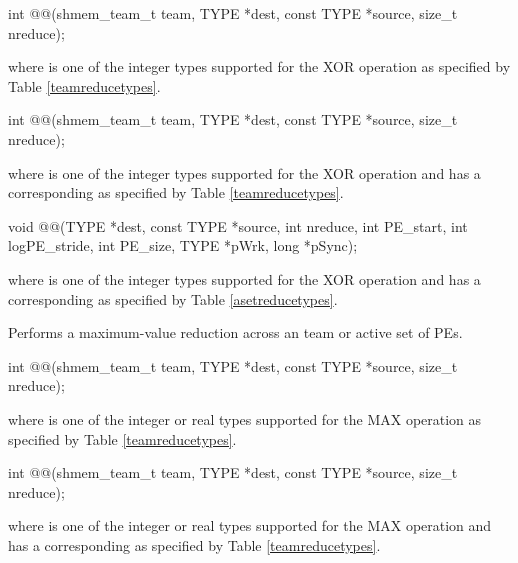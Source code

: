 \begin{apidefinition}
\begin{C11synopsis}
int @@(shmem_team_t team, TYPE *dest, const TYPE *source, size_t nreduce);
\end{C11synopsis}
where \TYPE{} is one of the integer types supported for the XOR operation as specified by Table \ref{teamreducetypes}.

\begin{Csynopsis}
\end{Csynopsis}
\begin{CsynopsisCol}
int @@(shmem_team_t team, TYPE *dest, const TYPE *source, size_t nreduce);
\end{CsynopsisCol}
where \TYPE{} is one of the integer types supported for the XOR operation and has a corresponding \TYPENAME{} as specified by Table \ref{teamreducetypes}.

\begin{DeprecateBlock}
\begin{CsynopsisCol}
void @@(TYPE *dest, const TYPE *source, int nreduce, int PE_start, int logPE_stride, int PE_size, TYPE *pWrk, long *pSync);
\end{CsynopsisCol}
\end{DeprecateBlock}
where \TYPE{} is one of the integer types supported for the XOR operation and has a corresponding \TYPENAME{} as specified by Table \ref{asetreducetypes}.

\label{subsec:shmem_max_reduce}
Performs a maximum-value reduction across an \openshmem team or active set of \acp{PE}.\newline

\begin{C11synopsis}
int @@(shmem_team_t team, TYPE *dest, const TYPE *source, size_t nreduce);
\end{C11synopsis}
where \TYPE{} is one of the integer or real types supported for the MAX operation as specified by Table \ref{teamreducetypes}.

\begin{Csynopsis}
\end{Csynopsis}

\begin{CsynopsisCol}
int @@(shmem_team_t team, TYPE *dest, const TYPE *source, size_t nreduce);
\end{CsynopsisCol}
where \TYPE{} is one of the integer or real types supported for the MAX operation and has a corresponding \TYPENAME{} as specified by Table \ref{teamreducetypes}.


\end{apidefinition}
